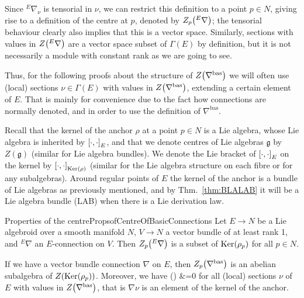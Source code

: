 \begin{remark}
\leavevmode\newline
Since ${}^E\nabla_\nu$ is tensorial in $\nu$, we can restrict this definition to a point $p \in N$, giving rise to a definition of the centre at $p$, denoted by $Z_p \mleft( {}^E\nabla \mright)$; the tensorial behaviour clearly also implies that this is a vector space. Similarly, sections with values in $Z\mleft( {}^E\nabla \mright)$ are a vector space subset of $\Gamma(E)$ by definition, but it is not necessarily a module with constant rank as we are going to see.

Thus, for the following proofs about the structure of $Z \mleft( \nabla^{\mathrm{bas}} \mright)$ we will often use (local) sections $\nu \in \Gamma(E)$ with values in $Z \mleft( \nabla^{\mathrm{bas}} \mright)$, extending a certain element of $E$. That is mainly for convenience due to the fact how connections are normally denoted, and in order to use the definition of $\nabla^{\mathrm{bas}}$.
\end{remark}

Recall that the kernel of the anchor $\rho$ at a point $p \in N$ is a Lie algebra, whose Lie algebra is inherited by $\mleft[ \cdot, \cdot \mright]_E$, and that we denote centres of Lie algebras $\mathfrak{g}$ by $Z(\mathfrak{g})$ (similar for Lie algebra bundles). We denote the Lie bracket of $\mleft[ \cdot, \cdot \mright]_E$ on the kernel by $\mleft[ \cdot, \cdot \mright]_{\mathrm{Ker}(\rho)}$ (similar for the Lie algebra structure on each fibre or for any subalgebras). Around regular points of $E$ the kernel of the anchor is a bundle of Lie algebras as previously mentioned, and by Thm.~\ref{thm:BLALAB} it will be a Lie algebra bundle (LAB) when there is a Lie derivation law.


\begin{propositions}{Properties of the centre}{PropsofCentreOfBasicConnections}
Let $E \to N$ be a Lie algebroid over a smooth manifold $N$, $V\to N$ a vector bundle of at least rank 1, and ${}^E\nabla$ an $E$-connection on $V$. Then $Z_p \mleft( {}^E\nabla \mright)$ is a subset of $\mathrm{Ker}\mleft(\rho_p\mright)$ for all $p \in N$.

If we have a vector bundle connection $\nabla$ on $E$, then $Z_p \mleft( \nabla^{\mathrm{bas}} \mright)$ is an abelian subalgebra of $Z \mleft(\mathrm{Ker}\mleft(\rho_p\mright)\mright)$. Moreover, we have
\ba\label{NablaZenterIstImKernyippie}
\rho(\nabla \nu)
&=0
\ea
for all (local) sections $\nu$ of $E$ with values in $Z\mleft( \nabla^{\mathrm{bas}} \mright)$, that is $\nabla \nu$ is an element of the kernel of the anchor.
\end{propositions}

